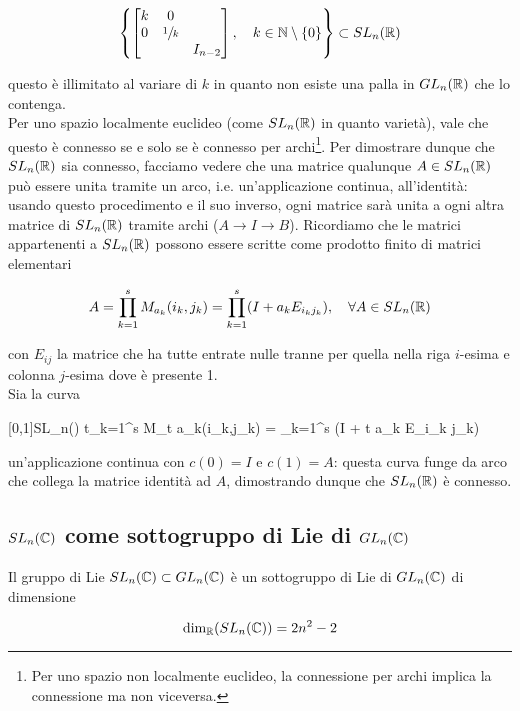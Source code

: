 \begin{equation}
	\left\{ %
			\bmqty{\dmat{ k & 0 \\ 0 & \sfrac{1}{k}, I_{n-2} }} \qcomma k \in \N \setminus \{0\}
	\right\} %
	\subset SL_{n}(\R)
\end{equation}

questo è illimitato al variare di $ k $ in quanto non esiste una palla in $ GL_{n}(\mathbb{R}) $ che lo contenga.\\
Per uno spazio localmente euclideo (come $ SL_{n}(\mathbb{R}) $ in quanto varietà), vale che questo è connesso se e solo se è connesso per archi\footnote{%
	Per uno spazio non localmente euclideo, la connessione per archi implica la connessione ma non viceversa.%
}. Per dimostrare dunque che $ SL_{n}(\mathbb{R}) $ sia connesso, facciamo vedere che una matrice qualunque $ A \in SL_{n}(\mathbb{R}) $ può essere unita tramite un arco, i.e. un'applicazione continua, all'identità: usando questo procedimento e il suo inverso, ogni matrice sarà unita a ogni altra matrice di $ SL_{n}(\mathbb{R}) $ tramite archi ($ A \to I \to B $). Ricordiamo che le matrici appartenenti a $ SL_{n}(\mathbb{R}) $ possono essere scritte come prodotto finito di matrici elementari

\begin{equation}
	A = \prod_{k=1}^{s} M_{a_{k}}(i_{k},j_{k}) %
	= \prod_{k=1}^{s} (I + a_{k} E_{i_{k} j_{k}}) %
	\qcomma \forall A \in SL_{n}(\R)
\end{equation}

con $ E_{ij} $ la matrice che ha tutte entrate nulle tranne per quella nella riga $ i $-esima e colonna $ j $-esima dove è presente 1.\\
Sia la curva

	{[0,1]}{SL_{n}(\R)}
	{t}{\prod_{k=1}^{s} M_{t a_{k}}(i_{k},j_{k}) = \prod_{k=1}^{s} (I + t a_{k} E_{i_{k} j_{k}})}
	
un'applicazione continua con $ c(0) = I $ e $ c(1) = A $: questa curva funge da arco che collega la matrice identità ad $ A $, dimostrando dunque che $ SL_{n}(\mathbb{R}) $ è connesso.

\subsection{$ SL_{n}(\mathbb{C}) $ come sottogruppo di Lie di $ GL_{n}(\mathbb{C}) $}

Il gruppo di Lie $ SL_{n}(\mathbb{C}) \subset GL_{n}(\mathbb{C}) $ è un sottogruppo di Lie di $ GL_{n}(\mathbb{C}) $ di dimensione

\begin{equation}
	\dim_{\mathbb{R}}(SL_{n}(\mathbb{C})) = 2 n^{2} - 2
\end{equation}

